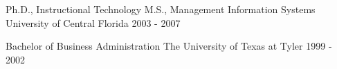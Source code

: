 


\begin{cventries}


\cventry
{Ph.D., Instructional Technology \newline {\vspace{-.75mm}}
M.S., Management Information Systems}  %
{University of Central Florida}
{} %
    {2003 - 2007} %
{ %
}

\cventry
{Bachelor of Business Administration} %
{The University of Texas at Tyler}
{} %
    {1999 - 2002} %
{ %
}


\end{cventries}

